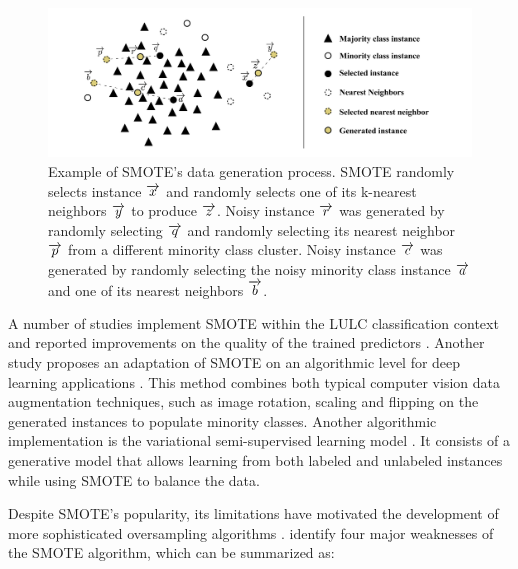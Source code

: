 \documentclass[preprint,12pt]{elsarticle}
\begin{document}
\begin{figure}
	\centering
    \captionsetup{justification=centering}
    \caption{Example of SMOTE's data generation process. SMOTE randomly
        selects instance $\protect\overrightarrow{x}$ and randomly selects one
        of its k-nearest neighbors $\protect\overrightarrow{y}$ to produce
        $\protect\overrightarrow{z}$.  Noisy instance
        $\protect\overrightarrow{r}$ was generated by randomly selecting
        $\protect\overrightarrow{q}$ and randomly selecting its nearest
        neighbor $\protect\overrightarrow{p}$ from a different minority class
        cluster. Noisy instance $\protect\overrightarrow{c}$ was generated by
        randomly selecting the noisy minority class instance
        $\protect\overrightarrow{a}$ and one of its nearest neighbors
        $\protect\overrightarrow{b}$.
    \vspace{.2cm}}
	\label{fig:smote_example}
	\includegraphics[width=1\linewidth]{../analysis/smote_example}
\end{figure}

A number of studies implement SMOTE within the LULC classification context and
reported improvements on the quality of the trained predictors
\cite{Jozdani2019, Bogner2018}. Another study proposes an adaptation of SMOTE
on an algorithmic level for deep learning applications \cite{Zhu2020}. This
method combines both typical computer vision data augmentation techniques,
such as image rotation, scaling and flipping on the generated instances to
populate minority classes. Another algorithmic implementation is the
variational semi-supervised learning model \cite{Cenggoro2018}. It consists of
a generative model that allows learning from both labeled and unlabeled
instances while using SMOTE to balance the data.

Despite SMOTE's popularity, its limitations have motivated the development of
more sophisticated oversampling algorithms \cite{Douzas2019, Han2005, Ma2017,
Douzas2017, Douzas2018, HaiboHe2008}. \cite{Douzas2019} identify four major
weaknesses of the SMOTE algorithm, which can be summarized as:
\end{document}

